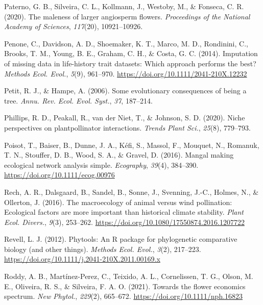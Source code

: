 \documentclass[
  12pt,
  a4paper,
]{article}
\newlength{\cslhangindent}
\newlength{\cslentryspacingunit} %
\newenvironment{CSLReferences}[2] %
 {%
  \setlength{\parindent}{0pt}
  \ifodd #1
  \let\oldpar\par
  \def\par{\hangindent=\cslhangindent\oldpar}
  \fi
  \setlength{\parskip}{#2\cslentryspacingunit}
 }%
 {}
\begin{document}
\begin{CSLReferences}{1}{0}
\leavevmode{}%
Paterno, G. B., Silveira, C. L., Kollmann, J., Westoby, M., \& Fonseca, C. R. (2020). The maleness of larger angiosperm flowers. \emph{Proceedings of the National Academy of Sciences}, \emph{117}(20), 10921--10926.

\leavevmode{}%
Penone, C., Davidson, A. D., Shoemaker, K. T., Marco, M. D., Rondinini, C., Brooks, T. M., Young, B. E., Graham, C. H., \& Costa, G. C. (2014). Imputation of missing data in life-history trait datasets: Which approach performs the best? \emph{Methods Ecol. Evol.}, \emph{5}(9), 961--970. \url{https://doi.org/10.1111/2041-210X.12232}

\leavevmode{}%
Petit, R. J., \& Hampe, A. (2006). Some evolutionary consequences of being a tree. \emph{Annu. Rev. Ecol. Evol. Syst.}, \emph{37}, 187--214.

\leavevmode{}%
Phillips, R. D., Peakall, R., van der Niet, T., \& Johnson, S. D. (2020). Niche perspectives on plant\textendash pollinator interactions. \emph{Trends Plant Sci.}, \emph{25}(8), 779--793.

\leavevmode{}%
Poisot, T., Baiser, B., Dunne, J. A., Kéfi, S., Massol, F., Mouquet, N., Romanuk, T. N., Stouffer, D. B., Wood, S. A., \& Gravel, D. (2016). Mangal \textendash{} making ecological network analysis simple. \emph{Ecography}, \emph{39}(4), 384--390. \url{https://doi.org/10.1111/ecog.00976}

\leavevmode{}%
Rech, A. R., Dalsgaard, B., Sandel, B., Sonne, J., Svenning, J.-C., Holmes, N., \& Ollerton, J. (2016). The macroecology of animal versus wind pollination: Ecological factors are more important than historical climate stability. \emph{Plant Ecol. Divers.}, \emph{9}(3), 253--262. \url{https://doi.org/10.1080/17550874.2016.1207722}

\leavevmode{}%
Revell, L. J. (2012). Phytools: An {R} package for phylogenetic comparative biology (and other things). \emph{Methods Ecol. Evol.}, \emph{3}(2), 217--223. \url{https://doi.org/10.1111/j.2041-210X.2011.00169.x}

\leavevmode{}%
Roddy, A. B., Martínez-Perez, C., Teixido, A. L., Cornelissen, T. G., Olson, M. E., Oliveira, R. S., \& Silveira, F. A. O. (2021). Towards the flower economics spectrum. \emph{New Phytol.}, \emph{229}(2), 665--672. \url{https://doi.org/10.1111/nph.16823}


\end{CSLReferences}
\end{document}
